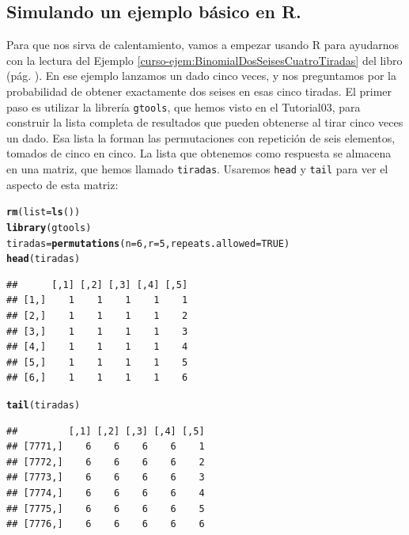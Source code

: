 \documentclass[10pt,a4paper]{article}\usepackage[]{graphicx}\usepackage[]{color}
\makeatletter
\newcommand{\hlnum}[1]{\textcolor[rgb]{0.686,0.059,0.569}{#1}}%
\newcommand{\hlstd}[1]{\textcolor[rgb]{0.345,0.345,0.345}{#1}}%
\newcommand{\hlkwb}[1]{\textcolor[rgb]{0.69,0.353,0.396}{#1}}%
\newcommand{\hlkwc}[1]{\textcolor[rgb]{0.333,0.667,0.333}{#1}}%
\newcommand{\hlkwd}[1]{\textcolor[rgb]{0.737,0.353,0.396}{\textbf{#1}}}%
\newenvironment{kframe}{%
 \def\at@end@of@kframe{}%
 \ifinner\ifhmode%
  \def\at@end@of@kframe{\end{minipage}}%
  \begin{minipage}{\columnwidth}%
 \fi\fi%
 \def\FrameCommand##1{\hskip\@totalleftmargin \hskip-\fboxsep
 \colorbox{shadecolor}{##1}\hskip-\fboxsep
     \hskip-\linewidth \hskip-\@totalleftmargin \hskip\columnwidth}%
 \MakeFramed {\advance\hsize-\width
   \@totalleftmargin\z@ \linewidth\hsize
   \@setminipage}}%
 {\par\unskip\endMakeFramed%
 \at@end@of@kframe}
\newenvironment{knitrout}{}{} %
\makeatother
\begin{document}
\subsection{Simulando un ejemplo básico en R.}
\label{tut05:subsec:SimulandoEjemploBinomial}


Para que nos sirva de calentamiento, vamos a empezar usando R para ayudarnos con la lectura del Ejemplo \ref{curso-ejem:BinomialDosSeisesCuatroTiradas} del libro (pág. \pageref{curso-ejem:BinomialDosSeisesCuatroTiradas}). En ese ejemplo lanzamos un dado cinco veces, y nos preguntamos por la probabilidad de obtener exactamente dos seises en esas cinco tiradas. El primer paso es utilizar la librería {\tt gtools}, que hemos visto en el Tutorial03, para construir la lista completa de resultados que pueden  obtenerse al tirar cinco veces un dado. Esa lista la forman las permutaciones con repetición de seis elementos, tomados de cinco en cinco. La lista que obtenemos como respuesta se almacena en una matriz, que hemos llamado {\tt tiradas}. Usaremos {\tt head} y {\tt tail} para ver el aspecto de esta matriz:
\begin{knitrout}
\color{fgcolor}\begin{kframe}
\begin{alltt}
\hlkwd{rm}\hlstd{(}\hlkwc{list}\hlstd{=}\hlkwd{ls}\hlstd{())}
\hlkwd{library}\hlstd{(gtools)}
\hlstd{tiradas} \hlkwb{=} \hlkwd{permutations}\hlstd{(}\hlkwc{n}\hlstd{=}\hlnum{6}\hlstd{,} \hlkwc{r} \hlstd{=} \hlnum{5}\hlstd{,} \hlkwc{repeats.allowed} \hlstd{=} \hlnum{TRUE}\hlstd{)}
\hlkwd{head}\hlstd{(tiradas)}
\end{alltt}
\begin{verbatim}
##      [,1] [,2] [,3] [,4] [,5]
## [1,]    1    1    1    1    1
## [2,]    1    1    1    1    2
## [3,]    1    1    1    1    3
## [4,]    1    1    1    1    4
## [5,]    1    1    1    1    5
## [6,]    1    1    1    1    6
\end{verbatim}
\begin{alltt}
\hlkwd{tail}\hlstd{(tiradas)}
\end{alltt}
\begin{verbatim}
##         [,1] [,2] [,3] [,4] [,5]
## [7771,]    6    6    6    6    1
## [7772,]    6    6    6    6    2
## [7773,]    6    6    6    6    3
## [7774,]    6    6    6    6    4
## [7775,]    6    6    6    6    5
## [7776,]    6    6    6    6    6
\end{verbatim}
\end{kframe}
\end{knitrout}
\end{document}
